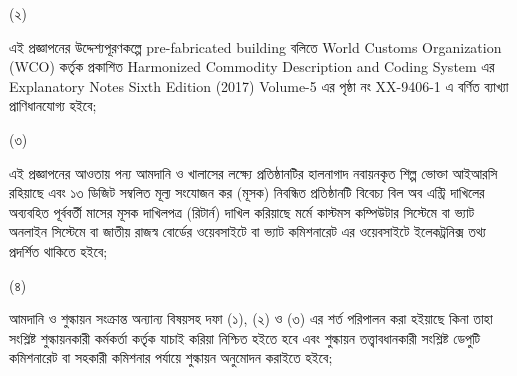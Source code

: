 \documentclass[12pt]{article}
\begin{document}
\begin{minipage}[t]{0.05\linewidth}
\hspace{1em}
\end{minipage}
\begin{minipage}[t]{0.05\linewidth}
(২)
\end{minipage}
\begin{minipage}[t]{0.9\linewidth}
এই প্রজ্ঞাপনের উদ্দেশ্যপূরণকল্পে
pre-fabricated building বলিতে
World Customs Organization (WCO) কর্তৃক
প্রকাশিত Harmonized Commodity Description
and Coding System এর Explanatory Notes
Sixth Edition (2017) Volume-5 এর পৃষ্ঠা নং
XX-9406-1 এ বর্ণিত ব্যাখ্যা প্রাণিধানযোগ্য হইবে;
\\
\end{minipage}
\begin{minipage}[t]{0.05\linewidth}
\hspace{1em}
\end{minipage}
\begin{minipage}[t]{0.05\linewidth}
(৩)
\end{minipage}
\begin{minipage}[t]{0.9\linewidth}
এই প্রজ্ঞাপনের আওতায় পন্য আমদানি ও খালাসের লক্ষ্যে
প্রতিষ্ঠানটির হালনাগাদ নবায়নকৃত শিল্প ভোক্তা
আইআরসি রহিয়াছে এবং ১৩ ডিজিট সম্বলিত মূল্য
সংযোজন কর (মূসক) নিবন্ধিত প্রতিষ্ঠানটি বিবেচ্য
বিল অব এন্ট্রি দাখিলের অব্যবহিত পূর্ববর্তী মাসের
মূসক দাখিলপত্র (রিটার্ন) দাখিল করিয়াছে মর্মে
কাস্টমস  কম্পিউটার সিস্টেমে বা ভ্যাট অনলাইন সিস্টেমে
বা জাতীয় রাজস্ব বোর্ডের ওয়েবসাইটে বা ভ্যাট কমিশনারেট
এর ওয়েবসাইটে ইলেকট্রনিক্স তথ্য প্রদর্শিত থাকিতে হইবে;
\\
\end{minipage}
\begin{minipage}[t]{0.05\linewidth}
\hspace{1em}
\end{minipage}
\begin{minipage}[t]{0.05\linewidth}
(৪)
\end{minipage}
\begin{minipage}[t]{0.9\linewidth}
আমদানি ও শুল্কায়ন সংক্রান্ত অন্যান্য বিষয়সহ
দফা (১), (২) ও (৩) এর শর্ত পরিপালন করা হইয়াছে কিনা
তাহা সংশ্লিষ্ট শুল্কায়নকারী কর্মকর্তা কর্তৃক যাচাই করিয়া
নিশ্চিত হইতে হবে এবং শুল্কায়ন তত্ত্বাবধানকারী সংশ্লিষ্ট ডেপুটি
কমিশনারেট বা সহকারী কমিশনার পর্যায়ে শুল্কায়ন
অনুমোদন করাইতে হইবে;
\\
\end{minipage}
\begin{minipage}[t]{0.05\linewidth}
\hspace{1em}
\end{minipage}
\end{document}
